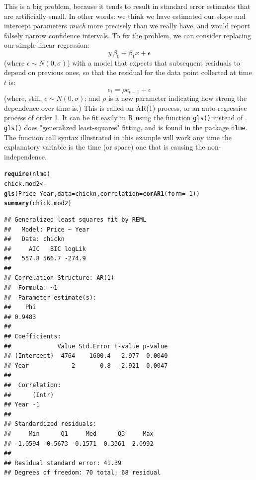 \documentclass[twoside]{book}\usepackage[]{graphicx}\usepackage[]{xcolor}
\makeatletter
\newcommand{\hlnum}[1]{\textcolor[rgb]{0.686,0.059,0.569}{#1}}%
\newcommand{\hlopt}[1]{\textcolor[rgb]{0,0,0}{#1}}%
\newcommand{\hlstd}[1]{\textcolor[rgb]{0.345,0.345,0.345}{#1}}%
\newcommand{\hlkwb}[1]{\textcolor[rgb]{0.69,0.353,0.396}{#1}}%
\newcommand{\hlkwc}[1]{\textcolor[rgb]{0.333,0.667,0.333}{#1}}%
\newcommand{\hlkwd}[1]{\textcolor[rgb]{0.737,0.353,0.396}{\textbf{#1}}}%
\newenvironment{kframe}{%
 \def\at@end@of@kframe{}%
 \ifinner\ifhmode%
  \def\at@end@of@kframe{\end{minipage}}%
  \begin{minipage}{\columnwidth}%
 \fi\fi%
 \def\FrameCommand##1{\hskip\@totalleftmargin \hskip-\fboxsep
 \colorbox{shadecolor}{##1}\hskip-\fboxsep
     \hskip-\linewidth \hskip-\@totalleftmargin \hskip\columnwidth}%
 \MakeFramed {\advance\hsize-\width
   \@totalleftmargin\z@ \linewidth\hsize
   \@setminipage}}%
 {\par\unskip\endMakeFramed%
 \at@end@of@kframe}
\newenvironment{knitrout}{}{} %
\newcounter{example}[section]
\makeatother
\begin{document}
This is a big problem, because it tends to result in standard error estimates that are artificially small. In other words: we think we have estimated our slope and intercept parameters \emph{much} more precisely than we really have, and would report falsely narrow confidence intervals.
To fix the problem, we can consider replacing our simple linear regression:
$$ y ~ \beta_0 + \beta_1x + \epsilon$$
(where $\epsilon \sim N(0, \sigma)$) with a model that expects that subsequent residuals to depend on previous ones, so that the residual for the data point collected at time $t$ is:
$$ e_t = \rho e_{t-1} + \epsilon$$
(where, still, $\epsilon \sim N(0, \sigma)$; and $\rho$ is a new parameter indicating how strong the dependence over time is.)  This is called an AR(1) process, or an auto-regressive process of order 1.  It can be fit easily in R using the function \texttt{gls()} instead of . \texttt{gls()} does "generalized least-squares" fitting, and is found in the package \texttt{nlme}.  The function call syntax illustrated in this example will work any time the explanatory variable is the time (or space) one that is causing the non-independence.

\begin{knitrout}
\color{fgcolor}\begin{kframe}
\begin{alltt}
\hlkwd{require}\hlstd{(nlme)}
\hlstd{chick.mod2} \hlkwb{<-}
  \hlkwd{gls}\hlstd{(Price} \hlopt{~} \hlstd{Year,} \hlkwc{data} \hlstd{= chickn,} \hlkwc{correlation} \hlstd{=} \hlkwd{corAR1}\hlstd{(}\hlkwc{form} \hlstd{=} \hlopt{~} \hlnum{1}\hlstd{))}
\hlkwd{summary}\hlstd{(chick.mod2)}
\end{alltt}
\begin{verbatim}
## Generalized least squares fit by REML
##   Model: Price ~ Year 
##   Data: chickn 
##     AIC   BIC logLik
##   557.8 566.7 -274.9
## 
## Correlation Structure: AR(1)
##  Formula: ~1 
##  Parameter estimate(s):
##    Phi 
## 0.9483 
## 
## Coefficients:
##             Value Std.Error t-value p-value
## (Intercept)  4764    1600.4   2.977  0.0040
## Year           -2       0.8  -2.921  0.0047
## 
##  Correlation: 
##      (Intr)
## Year -1    
## 
## Standardized residuals:
##     Min      Q1     Med      Q3     Max 
## -1.0594 -0.5673 -0.1571  0.3361  2.0992 
## 
## Residual standard error: 41.39 
## Degrees of freedom: 70 total; 68 residual
\end{verbatim}
\end{kframe}
\end{knitrout}
\end{document}
